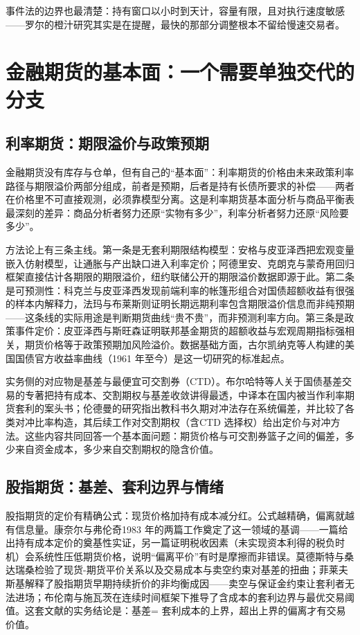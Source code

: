 \documentclass[12pt,a4paper]{ctexart}
\begin{document}
事件法的边界也最清楚：持有窗口以小时到天计，容量有限，且对执行速度敏感——罗尔的橙汁研究其实是在提醒，最快的那部分调整根本不留给慢速交易者\cite{18}。

\section{金融期货的基本面：一个需要单独交代的分支}

\subsection{利率期货：期限溢价与政策预期}

金融期货没有库存与仓单，但有自己的“基本面”：利率期货的价格由未来政策利率路径与期限溢价两部分组成，前者是预期，后者是持有长债所要求的补偿——两者在价格里不可直接观测，必须靠模型分离。这是利率期货基本面分析与商品平衡表最深刻的差异：商品分析者努力还原“实物有多少”，利率分析者努力还原“风险要多少”。

方法论上有三条主线。第一条是无套利期限结构模型：安格与皮亚泽西把宏观变量嵌入仿射模型，让通胀与产出缺口进入利率定价\cite{68}；阿德里安、克朗克与蒙奇用回归框架直接估计各期限的期限溢价，纽约联储公开的期限溢价数据即源于此\cite{67}。第二条是可预测性：科克兰与皮亚泽西发现前端利率的帐篷形组合对国债超额收益有很强的样本内解释力\cite{66}，法玛与布莱斯则证明长期远期利率包含期限溢价信息而非纯预期\cite{69}——这条线的实际用途是判断期货曲线“贵不贵”，而非预测利率方向。第三条是政策事件定价：皮亚泽西与斯旺森证明联邦基金期货的超额收益与宏观周期指标强相关，期货价格等于政策预期加风险溢价\cite{70}。数据基础方面，古尔凯纳克等人构建的美国国债官方收益率曲线（1961 年至今）是这一切研究的标准起点\cite{65}。

实务侧的对应物是基差与最便宜可交割券（CTD）。布尔哈特等人关于国债基差交易的专著把持有成本、交割期权与基差收敛讲得最透，中译本在国内被当作利率期货套利的案头书\cite{45}；伦德曼的研究指出教科书久期对冲法存在系统偏差，并比较了各类对冲比率构造\cite{77}，其后续工作对交割期权（含CTD 选择权）给出定价与对冲方法\cite{78}。这些内容共同回答一个基本面问题：期货价格与可交割券篮子之间的偏差，多少来自资金成本，多少来自交割期权的隐含价值。

\subsection{股指期货：基差、套利边界与情绪}

股指期货的定价有精确公式：现货价格加持有成本减分红。公式越精确，偏离就越有信息量。康奈尔与弗伦奇1983 年的两篇工作奠定了这一领域的基调——一篇给出持有成本定价的奠基性实证\cite{71}，另一篇证明税收因素（未实现资本利得的税负时机）会系统性压低期货价格，说明“偏离平价”有时是摩擦而非错误。莫德斯特与桑达瑞桑检验了现货-期货平价关系以及交易成本与卖空约束对基差的扭曲\cite{72}；菲莱夫斯基解释了股指期货早期持续折价的非均衡成因——卖空与保证金约束让套利者无法进场\cite{73}；布伦南与施瓦茨在连续时间框架下推导了含成本的套利边界与最优交易阈值\cite{74}。这套文献的实务结论是：基差= 套利成本的上界，超出上界的偏离才有交易价值。
\end{document}
